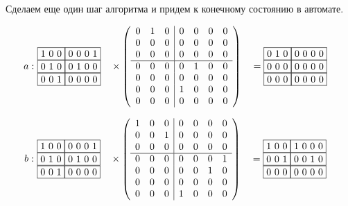 \begin{example}
Сделаем еще один шаг алгоритма и придем к конечному состоянию в автомате.

\begin{alignat*}{7}
  a:\,\,
  & \begin{matrix}
    \fbox{1 0 0} \fbox{0 0 0 1} \\ 
    \fbox{0 1 0} \fbox{0 1 0 0} \\
    \fbox{0 0 1} \fbox{0 0 0 0}
      \end{matrix}  &&
      \times
      \left(\begin{array}{c c c | c c c c}
      0 & 1 & 0 & 0 & 0 & 0 & 0 \\
      0 & 0 & 0 & 0 & 0 & 0 & 0 \\
      0 & 0 & 0 & 0 & 0 & 0 & 0 \\
      \hline
      0 & 0 & 0 & 0 & 1 & 0 & 0 \\
      0 & 0 & 0 & 0 & 0 & 0 & 0 \\
      0 & 0 & 0 & 1 & 0 & 0 & 0 \\
      0 & 0 & 0 & 0 & 0 & 0 & 0 
      \end{array}\right)
      &&= \begin{matrix}
        \fbox{0 1 0} \fbox{0 0 0 0} \\ 
        \fbox{0 0 0} \fbox{0 0 0 0} \\
        \fbox{0 0 0} \fbox{0 0 0 0}
    \end{matrix}
\end{alignat*}
  
\begin{alignat*}{7}
  b:\,\,
  & \begin{matrix}
    \fbox{1 0 0} \fbox{0 0 0 1} \\ 
    \fbox{0 1 0} \fbox{0 1 0 0} \\
    \fbox{0 0 1} \fbox{0 0 0 0}
      \end{matrix}  &&
      \times
      \left(\begin{array}{c c c | c c c c}
      1 & 0 & 0 & 0 & 0 & 0 & 0 \\
      0 & 0 & 1 & 0 & 0 & 0 & 0 \\
      0 & 0 & 0 & 0 & 0 & 0 & 0 \\
      \hline
      0 & 0 & 0 & 0 & 0 & 0 & 1 \\
      0 & 0 & 0 & 0 & 0 & 1 & 0 \\
      0 & 0 & 0 & 0 & 0 & 0 & 0 \\
      0 & 0 & 0 & 1 & 0 & 0 & 0 
      \end{array}\right)
      &&= \begin{matrix}
        \fbox{1 0 0} \fbox{1 0 0 0} \\ 
        \fbox{0 0 1} \fbox{0 0 1 0} \\
        \fbox{0 0 0} \fbox{0 0 0 0}
    \end{matrix}
\end{alignat*}


\end{example}
